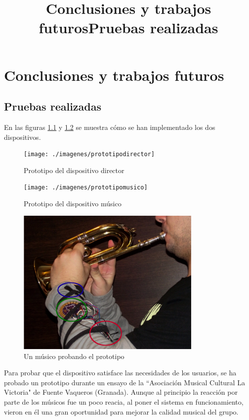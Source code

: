 \chapter{Conclusiones y trabajos futuros}
\title{Conclusiones y trabajos futuros}

\section{Pruebas realizadas}
\title{Pruebas realizadas}

En las figuras \ref{fig:protodirector} y \ref{fig:protomusico} se muestra cómo se han
implementado los dos dispositivos.

\begin{figure}[!htb]
\centering
\captionsetup{justification=centering}
\texttt{[image: ./imagenes/prototipodirector]}
\caption{Prototipo del dispositivo director} \label{fig:protodirector}
\end{figure}

\begin{figure}[!htb]
\centering
\captionsetup{justification=centering}
\texttt{[image: ./imagenes/prototipomusico]}
\caption{Prototipo del dispositivo músico} \label{fig:protomusico}
\end{figure}


\begin{figure}[htb]
\centering
\captionsetup{justification=centering}
\includegraphics[width=0.8\textwidth]{./imagenes/musicoprobando}
\caption{Un músico probando el prototipo} \label{fig:musicoprobando}
\end{figure}

Para probar que el dispositivo satisface las necesidades de los usuarios, se ha
probado un prototipo durante un ensayo de la ``Asociación Musical Cultural La Victoria"
de Fuente Vaqueros (Granada). Aunque al principio la reacción por parte de los músicos
fue un poco reacia, al poner el sistema en funcionamiento, vieron en él una gran
oportunidad para mejorar la calidad musical del grupo.\\

